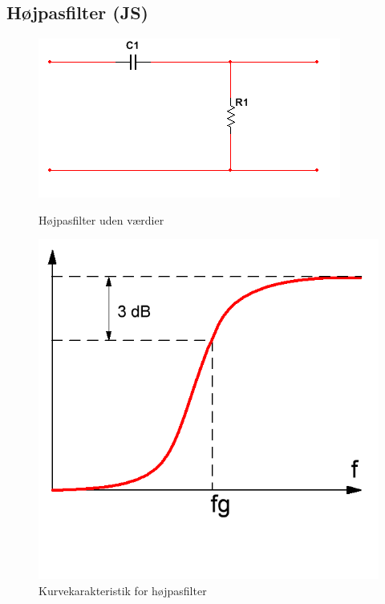 \subsection{Højpasfilter (JS)}

\begin{figure}[H]
  \begin{minipage}{0.45\textwidth}
    \centering
      \includegraphics[width=\textwidth]{billeder/HWdesign/HP_UV}
      \caption{Højpasfilter uden værdier}
    \label{fig:HP_UV}
  \end{minipage}
  \hspace{0.1\textwidth}
  \begin{minipage}{0.45\textwidth}
    \centering
      \includegraphics[width=\textwidth]{billeder/HWdesign/HP_KURVE}
      \caption{Kurvekarakteristik for højpasfilter}
    \label{fig:HP_KURVE}
  \end{minipage}
\end{figure}

